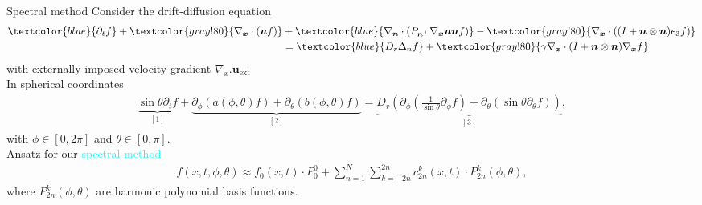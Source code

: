 \begin{frame}{Spectral method}
	\scriptsize
	Consider the drift-diffusion equation
	\begin{align}
		\textcolor{blue}{\partial_t f}+ \textcolor{gray!80}{\nabla_{\boldsymbol{x}} \cdot(\boldsymbol{u} f)} & +\textcolor{blue}{\nabla_{\boldsymbol{n}} \cdot\left(P_{\boldsymbol{n}^{\perp}} \nabla_{\boldsymbol{x}} \boldsymbol{u} \boldsymbol{n} f\right)}-\textcolor{gray!80}{\nabla_{\boldsymbol{x}} \cdot\left((I+\boldsymbol{n} \otimes \boldsymbol{n}) e_3 f\right)} \notag \\
		& = \textcolor{blue}{D_r \Delta_n f}+\textcolor{gray!80}{\gamma \nabla_{\boldsymbol{x}} \cdot(I+\boldsymbol{n} \otimes \boldsymbol{n}) \nabla_{\boldsymbol{x}} f} \label{SmochEq_kurz}
	\end{align}
	with externally imposed velocity gradient $\nabla_x. \boldsymbol{u}_{\mathrm{ext}}$\\
	\vspace{12pt}
	\pause
	In spherical coordinates
	\begin{align}
		\underbrace{\sin \theta \partial_t f}_{[1]} + \underbrace{\partial_\phi\left(a(\phi, \theta) f\right)+\partial_\theta\left(b(\phi, \theta) f\right)}_{[2]} = \underbrace{D_r \left(\partial_\phi\left(\frac{1}{\sin \theta} \partial_\phi f\right)+\partial_\theta\left(\sin \theta \partial_\theta f\right)\right)}_{[3]}, \label{Smoch_S2}
	\end{align}	
	with $\phi \in [0, 2 \pi]$ and $\theta \in [0, \pi]$.\\
	\vspace{12pt}
	\pause
  Ansatz for our \textcolor{cyan}{spectral method}
\begin{align}
	f(x,t,\phi, \theta) \approx f_0(x,t) \cdot P_0^0 + \sum_{n=1}^{N} \sum_{k=-2n}^{2n} c^k_{2n}(x,t) \cdot P^k_{2n}(\phi, \theta), \label{ansatz}
\end{align}
where $P^k_{2n}(\phi, \theta)$ are harmonic polynomial basis functions.  %
\end{frame}

